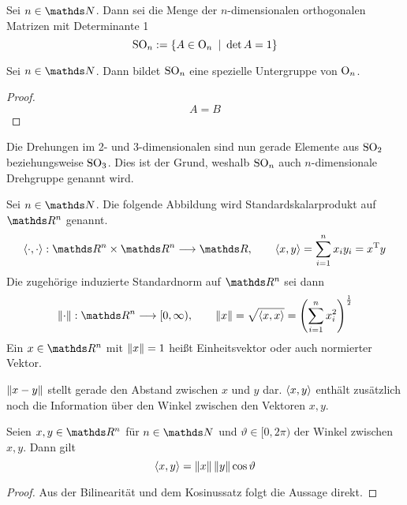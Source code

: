 		\begin{definition}
			Sei $n\in\SN$.
			Dann sei die Menge der $n$-dimensionalen orthogonalen Matrizen mit Determinante 1
			\[
				\mathrm{SO}_n := \left\{ A\in \mathrm{O}_n \enspace \middle\vert \enspace \det A = 1 \right\}
			\]
		\end{definition}

		\begin{lemma}
			Sei $n\in\SN$.
			Dann bildet $\mathrm{SO}_n$ eine spezielle Untergruppe von $\mathrm{O}_n$.
		\end{lemma}
		\begin{proof}
			\[ A=B \]
		\end{proof}

		Die Drehungen im 2- und 3-dimensionalen sind nun gerade Elemente aus $\mathrm{SO}_2$ beziehungsweise $\mathrm{SO}_3$.
		Dies ist der Grund, weshalb $\mathrm{SO}_n$ auch $n$-dimensionale Drehgruppe genannt wird.



		\begin{definition}
			Sei $n\in\SN$. 
			Die folgende Abbildung wird Standardskalarprodukt auf $\SR^n$ genannt.
			\[
				\angleb{\cdot, \cdot}:\SR^n\times\SR^n\longrightarrow\SR,\qquad \angleb{x,y} = \sum_{i=1}^n x_iy_i = x\transp y
			\]
			Die zugehörige induzierte Standardnorm auf $\SR^n$ sei dann
			\[
				\norm{\cdot}:\SR^n\longrightarrow[0,\infty),\qquad \norm{x} = \sqrt{\angleb{x,x}} = \curvb{\sum_{i=1}^n x_i^2}^{\frac{1}{2}}
			\]
			Ein $x\in\SR^n$ mit $\left\| x \right\|=1$ heißt Einheitsvektor oder auch normierter Vektor.
		\end{definition}

		$\left\| x-y \right\|$ stellt gerade den Abstand zwischen $x$ und $y$ dar.
		$\left\langle x,y \right\rangle$ enthält zusätzlich noch die Information über den Winkel zwischen den Vektoren $x,y$.

		\begin{proposition}
		\label{prop:skalarproduktregel}
			Seien $x,y\in\SR^n$ für $n\in\SN$ und $\vartheta\in[0,2\pi)$ der Winkel zwischen $x,y$. Dann gilt
			\[
				\left\langle x,y \right\rangle = \left\| x \right\|\left\| y \right\|\cos \vartheta
			\]
		\end{proposition}
		\begin{proof}
			Aus der Bilinearität und dem Kosinussatz folgt die Aussage direkt.
		\end{proof}

